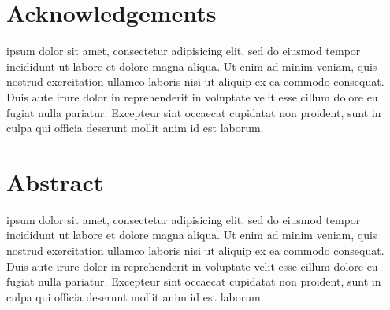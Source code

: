 \documentclass[12pt,twoside,a4paper]{article}
\numberwithin{equation}{section}
\begin{document}


\newpage
\thispagestyle{empty}

\section*{Acknowledgements}
ipsum dolor sit amet, consectetur adipisicing elit, sed do eiusmod tempor incididunt ut labore et dolore magna aliqua. Ut enim ad minim veniam, quis nostrud exercitation ullamco laboris nisi ut aliquip ex ea commodo consequat. Duis aute irure dolor in reprehenderit in voluptate velit esse cillum dolore eu fugiat nulla pariatur. Excepteur sint occaecat cupidatat non proident, sunt in culpa qui officia deserunt mollit anim id est laborum.

\newpage
\thispagestyle{empty}

\section*{Abstract}
ipsum dolor sit amet, consectetur adipisicing elit, sed do eiusmod tempor incididunt ut labore et dolore magna aliqua. Ut enim ad minim veniam, quis nostrud exercitation ullamco laboris nisi ut aliquip ex ea commodo consequat. Duis aute irure dolor in reprehenderit in voluptate velit esse cillum dolore eu fugiat nulla pariatur. Excepteur sint occaecat cupidatat non proident, sunt in culpa qui officia deserunt mollit anim id est laborum.

\newpage
{
  \hypersetup{hidelinks}
  \tableofcontents
}

\newpage
\thispagestyle{empty}
\listoffigures
\listoftables

\newpage












\printbibliography[heading=bibintoc]
\end{document}
